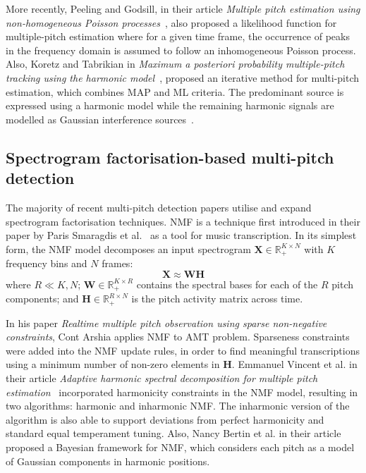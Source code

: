 More recently, Peeling and Godsill, in their article \textit{Multiple pitch estimation using non-homogeneous Poisson
processes}~\cite{peeling2011multiple}, also proposed a likelihood function for multiple-pitch estimation where for a
given time frame, the occurrence of peaks in the frequency domain is assumed to follow an inhomogeneous Poisson process.
Also, Koretz and Tabrikian in \textit{Maximum a posteriori probability multiple-pitch tracking using the harmonic
model}~\cite{koretz2011maximum}, proposed an iterative method for multi-pitch estimation, which combines \ac{MAP} and
\ac{ML} criteria. The predominant source is expressed using a harmonic model while the remaining harmonic signals are
modelled as Gaussian interference sources~\cite{koretz2011maximum}.

\pagebreak

\subsection{Spectrogram factorisation-based multi-pitch detection}\label{subsec:spectrogram-factorisation-based-multi-pitch-detection}
The majority of recent multi-pitch detection papers utilise and expand spectrogram factorisation techniques. \ac{NMF} is
a technique first introduced in their paper by Paris Smaragdis et al.~\cite{smaragdis2003non} as a tool for music
transcription. In its simplest form, the \ac{NMF} model decomposes an input spectrogram
$\pmb{X} \in \mathbb{R}^{K \times N}_+$ with $K$ frequency bins and $N$ frames: \[ \pmb{X} \approx \pmb{WH} \]
where $R \ll K, N$; $\pmb{W} \in \mathbb{R}^{K \times R}_+$ contains the spectral bases for each of the $R$ pitch
components; and $\pmb{H} \in \mathbb{R}^{R \times N}_+$ is the pitch activity matrix across time.

In his paper \textit{Realtime multiple pitch observation using sparse non-negative constraints}, Cont Arshia applies
\ac{NMF} to \ac{AMT} problem. Sparseness constraints were added into the \ac{NMF} update rules, in order to find
meaningful transcriptions using a minimum number of non-zero elements in $\pmb{H}$. Emmanuel Vincent et al. in their
article \textit{Adaptive harmonic spectral decomposition for multiple pitch estimation}~\cite{vincent2009adaptive}
incorporated harmonicity constraints in the \ac{NMF} model, resulting in two algorithms: harmonic and inharmonic
\ac{NMF}. The inharmonic version of the algorithm is also able to support deviations from perfect harmonicity and
standard equal temperament tuning. Also, Nancy Bertin et al. in their article~\cite{bertin2010enforcing} proposed
a Bayesian framework for \ac{NMF}, which considers each pitch as a model of Gaussian components in harmonic positions.

